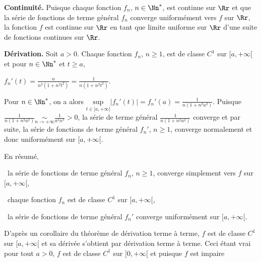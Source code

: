 {{\begin{center}
\end{center}

\textbf{Continuité.} Puisque chaque fonction $f_n$, $n\in\Nn^*$, est continue sur $\Rr$ et que la série de fonctions de terme général $f_n$ converge uniformément vers $f$ sur $\Rr$, la fonction $f$ est continue sur $\Rr$ en tant que limite uniforme sur $\Rr$ d'une suite de fonctions continues sur $\Rr$.

\begin{center}
\end{center}

\textbf{Dérivation.} Soit $a>0$. Chaque fonction $f_n$, $n\geqslant1$, est de classe $C^1$ sur $[a,+\infty[$ et pour $n\in\Nn^*$ et $t\geqslant a$,

\begin{center}
$f_n'(t)=\frac{n}{n^2(1+n^2t^2)}=\frac{1}{n(1+n^2t^2)}$.
\end{center}

Pour $n\in\Nn^*$, on a alors $\underset{t\in[a,+\infty[}{\text{sup}}|f_n'(t)|=f_n'(a)=\frac{1}{n(1+n^2a^2)}$. Puisque $\frac{1}{n(1+n^2a^2)}\underset{n\rightarrow+\infty}{\sim}\frac{1}{a^2n^3}>0$, la série de terme général $\frac{1}{n(1+n^2a^2)}$ converge et par suite, la série de fonctions de terme général $f_n'$, $n\geqslant1$, converge normalement et donc uniformément sur $[a,+\infty[$.

En résumé,

\textbullet~la série de fonctions de terme général $f_n$, $n\geqslant 1$, converge simplement vers $f$ sur $[a,+\infty[$,

\textbullet~chaque fonction $f_n$ est de classe $C^1$ sur $[a,+\infty[$,

\textbullet~la série de fonctions de terme général $f_n'$ converge uniformément sur $[a,+\infty[$.

D'après un corollaire du théorème de dérivation terme à terme, $f$ est de classe $C^1$ sur $[a,+\infty[$ et sa dérivée s'obtient par dérivation terme à terme. Ceci étant vrai pour tout $a>0$, $f$ est de classe $C^1$ sur $]0,+\infty[$ et puisque $f$ est impaire

\begin{center}
\end{center}

}}
